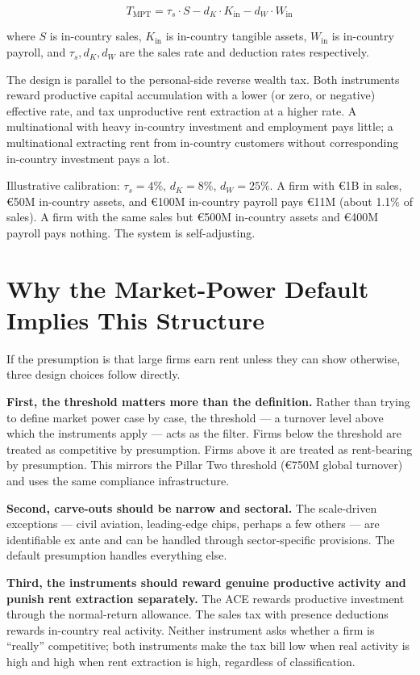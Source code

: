 \documentclass[11pt,a4paper]{article}
\begin{document}
\[
T_{\text{MPT}} = \tau_s \cdot S - d_K \cdot K_{\text{in}} - d_W \cdot W_{\text{in}}
\]

where $S$ is in-country sales, $K_{\text{in}}$ is in-country tangible assets, $W_{\text{in}}$ is in-country payroll, and $\tau_s, d_K, d_W$ are the sales rate and deduction rates respectively.

The design is parallel to the personal-side reverse wealth tax. Both instruments reward productive capital accumulation with a lower (or zero, or negative) effective rate, and tax unproductive rent extraction at a higher rate. A multinational with heavy in-country investment and employment pays little; a multinational extracting rent from in-country customers without corresponding in-country investment pays a lot.

Illustrative calibration: $\tau_s = 4\%$, $d_K = 8\%$, $d_W = 25\%$. A firm with €1B in sales, €50M in-country assets, and €100M in-country payroll pays €11M (about 1.1\% of sales). A firm with the same sales but €500M in-country assets and €400M payroll pays nothing. The system is self-adjusting.

\section{Why the Market-Power Default Implies This Structure}

If the presumption is that large firms earn rent unless they can show otherwise, three design choices follow directly.

\textbf{First, the threshold matters more than the definition.} Rather than trying to define market power case by case, the threshold — a turnover level above which the instruments apply — acts as the filter. Firms below the threshold are treated as competitive by presumption. Firms above it are treated as rent-bearing by presumption. This mirrors the Pillar Two threshold (€750M global turnover) and uses the same compliance infrastructure.

\textbf{Second, carve-outs should be narrow and sectoral.} The scale-driven exceptions — civil aviation, leading-edge chips, perhaps a few others — are identifiable ex ante and can be handled through sector-specific provisions. The default presumption handles everything else.

\textbf{Third, the instruments should reward genuine productive activity and punish rent extraction separately.} The ACE rewards productive investment through the normal-return allowance. The sales tax with presence deductions rewards in-country real activity. Neither instrument asks whether a firm is ``really'' competitive; both instruments make the tax bill low when real activity is high and high when rent extraction is high, regardless of classification.
\end{document}
